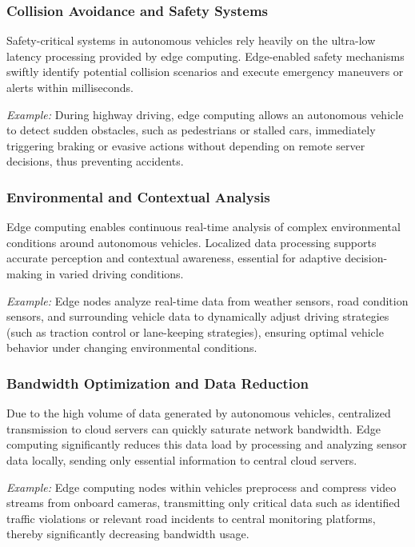 \documentclass[runningheads]{llncs}
\begin{document}
\subsubsection{Collision Avoidance and Safety Systems}
Safety-critical systems in autonomous vehicles rely heavily on the ultra-low latency processing provided by edge computing. Edge-enabled safety mechanisms swiftly identify potential collision scenarios and execute emergency maneuvers or alerts within milliseconds.

\textit{Example:} During highway driving, edge computing allows an autonomous vehicle to detect sudden obstacles, such as pedestrians or stalled cars, immediately triggering braking or evasive actions without depending on remote server decisions, thus preventing accidents.

\subsubsection{Environmental and Contextual Analysis}
Edge computing enables continuous real-time analysis of complex environmental conditions around autonomous vehicles. Localized data processing supports accurate perception and contextual awareness, essential for adaptive decision-making in varied driving conditions.

\textit{Example:} Edge nodes analyze real-time data from weather sensors, road condition sensors, and surrounding vehicle data to dynamically adjust driving strategies (such as traction control or lane-keeping strategies), ensuring optimal vehicle behavior under changing environmental conditions.

\subsubsection{Bandwidth Optimization and Data Reduction}
Due to the high volume of data generated by autonomous vehicles, centralized transmission to cloud servers can quickly saturate network bandwidth. Edge computing significantly reduces this data load by processing and analyzing sensor data locally, sending only essential information to central cloud servers.

\textit{Example:} Edge computing nodes within vehicles preprocess and compress video streams from onboard cameras, transmitting only critical data such as identified traffic violations or relevant road incidents to central monitoring platforms, thereby significantly decreasing bandwidth usage.
\end{document}
